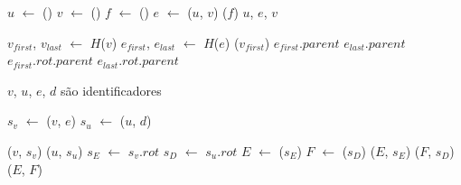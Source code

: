 \LCOSplice{}


\begin{algorithm}[htb]
\caption{\LCOMakeEdge()}
\label{Algo:LCOMakeEdge}
\begin{algorithmic}[1]
\State $u$ $\gets$ \LCOMakeNode()
\State $v$ $\gets$ \LCOMakeNode()
\State $f$ $\gets$ \LCOMakeNode()
\State $e$ $\gets$ \LCOLink($u$, $v$)
\State \LCOLoop($f$)
\State \Return $u$, $e$, $v$ 
\end{algorithmic}
\end{algorithm}

\begin{algorithm}[htb]
\caption{\LCOFindSubNode($v$, $e$)}
\label{Algo:LCOFindSubNode}
\begin{algorithmic}[1]
\State $v_{first}$, $v_{last}$ $\gets$ $H$($v$)
\State $e_{first}$, $e_{last}$ $\gets$ $H$($e$)
\State \linkcutEvert($v_{first}$)
\State \Return $e_{first}$.$parent$
\EndIf
\State \Return $e_{last}$.$parent$
\Else
{}
\State \Return $e_{first}.rot.parent$
\Else
\State \Return $e_{last}.rot.parent$
\EndIf
\EndIf
\end{algorithmic}
\end{algorithm}

$v$, $u$, $e$, $d$ são identificadores
\begin{algorithm}[htb]
\caption{\LCOSplice($v$, $e$, $u$, $d$)}
\label{Algo:LCOSplice}
\begin{algorithmic}[1]
\State $s_v$ $\gets$ \LCOFindSubNode($v$, $e$)
\State $s_u$ $\gets$ \LCOFindSubNode($u$, $d$)

\State \LCOCycle($v$, $s_v$)
\State \LCOSplit($u$, $s_u$)
\State $s_E$ $\gets$ $s_v$.$rot$
\State $s_D$ $\gets$ $s_u$.$rot$
\State $E$ $\gets$ \LCOFindNode($s_E$)
\State $F$ $\gets$ \LCOFindNode($s_D$)
\State \LCOCycle($E$, $s_E$)
\State \LCOCycle($F$, $s_D$)
\State \LCOMerge($E$, $F$)

\EndIf
\end{algorithmic}
\end{algorithm}

